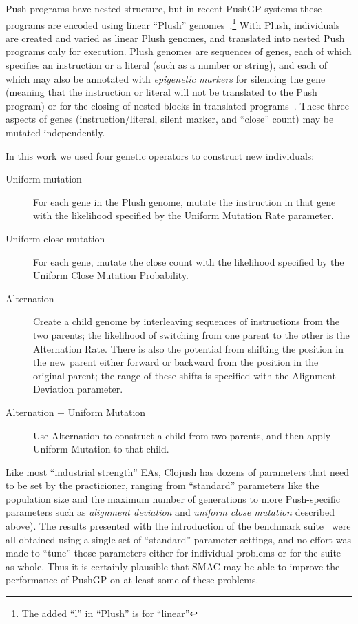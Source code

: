 Push programs have nested structure, but in recent PushGP systems these 
programs are encoded using linear ``Plush'' 
genomes~\cite{helmuthlinear}.\footnote{The added ``l'' in ``Plush'' 
	is for ``linear''}
With Plush, individuals are created and varied as linear Plush genomes, and 
translated into nested Push programs only for execution.
Plush genomes are sequences of genes, each of which specifies an instruction or 
a literal (such as a number or string), and each of which may also be annotated 
with {\it epigenetic markers} for silencing the gene (meaning that the instruction 
or literal will not be translated to the Push program) or for the closing of nested 
blocks in translated programs~\cite{la2015inheritable}. These three aspects of 
genes (instruction/literal, silent marker, and ``close'' count) may be mutated 
independently.

In this work we used four genetic operators to construct new individuals:
\begin{description}
	\item[Uniform mutation] For each gene in the Plush genome, mutate the 
	instruction in that gene with the likelihood specified by the Uniform Mutation 
	Rate parameter.
	\item[Uniform close mutation] For each gene, mutate the close count
	with the likelihood specified by the Uniform Close Mutation Probability.
	\item[Alternation] Create a child genome by interleaving sequences of instructions from the two parents; the likelihood of switching from one
	parent to the other is the Alternation Rate. There is also the potential from
	shifting the position in the new parent either forward or backward from
	the position in the original parent; the range of these shifts is specified
	with the Alignment Deviation parameter.
	\item[Alternation + Uniform Mutation] Use Alternation to construct a
	child from two parents, and then apply Uniform Mutation to that child.
\end{description}

Like most ``industrial
strength'' EAs, Clojush has dozens of parameters that need to be set by the
practicioner, ranging from ``standard'' parameters like the population size
and the maximum number of generations to more Push-specific parameters
such as \emph{alignment deviation} and \emph{uniform close mutation} 
described above). The results presented with the introduction of the
benchmark suite~\cite{Helmuth:2015:GECCO} were all obtained using a single
set of ``standard'' parameter settings, and no effort was made to ``tune''
those parameters either for individual problems or for the suite as whole.
Thus it is certainly plausible that SMAC may be able to improve the performance of PushGP on at least some of these problems.

